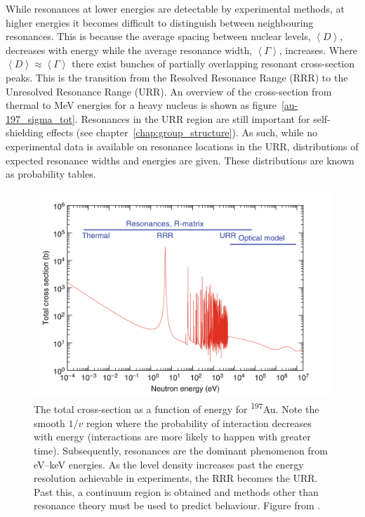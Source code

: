 While resonances at lower energies are detectable by experimental methods, at higher energies it becomes difficult to distinguish between neighbouring resonances. This is because the average spacing between nuclear levels, $\left<D\right>$, decreases with energy while the average resonance width, $\left<\Gamma\right>$, increases. Where $\left<D\right> \approx \left<\Gamma\right>$ there exist bunches of partially overlapping resonant cross-section peaks. This is the transition from the Resolved Resonance Range (RRR)  to the Unresolved Resonance Range (URR).  An overview of the cross-section from thermal to MeV energies for a heavy nucleus is shown as figure~\ref{au-197_sigma_tot}. Resonances in the URR region are still important for self-shielding effects (see chapter~\ref{chap:group_structure}). As such, while no experimental data is available on resonance locations in the URR, distributions of expected resonance widths and energies are given. These distributions are known as probability tables. 


\begin{figure}[ht]
  \includegraphics[width=\textwidth]{au-197_sigma_tot}
  \caption{The total cross-section as a function of energy for \textsuperscript{197}Au. Note the smooth $1/v$ region where the probability of interaction decreases with energy (interactions are more likely to happen with greater time). Subsequently, resonances are the dominant phenomenon from eV--keV energies. As the level density increases past the energy resolution achievable in experiments, the RRR becomes the URR. Past this, a continuum region is obtained and methods other than resonance theory must be used to predict behaviour. Figure from \cite{Cacuci2010}.}
  \label{fig:au-197_sigma_tot}
\end{figure}

